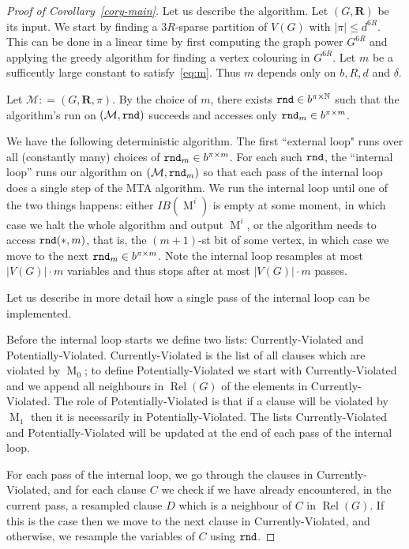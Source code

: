 \documentclass[12pt,a4paper]{article}
\numberwithin{equation}{section}
\theoremstyle{definition}
\newcommand{\de}{{\delta}}
\renewcommand{\le}{\leqslant}
\newcommand\NN{\mathbb N}
\renewcommand{\cal}[1]{{\mathcal #1}}
\newcommand\MT{\operatorname{M}}
\newcommand\Rel{\operatorname{Rel}}
\newcommand{\nn}{R}
\begin{document}
    
    \begin{proof}[Proof of Corollary~\ref{cory-main}]
       Let us describe the algorithm. Let $(G,\mathbf R)$ be its input. We start by finding a $3\nn$-sparse partition of $V(G)$ with $|\pi|\le d^{6\nn}$. This can be done in a linear time by first computing the graph power $G^{6\nn}$ and applying the greedy algorithm for finding a vertex colouring in $G^{6\nn}$. Let $m$ be a sufficently large constant to satisfy~\eqref{eq:m}. Thus $m$ depends only on $b,\nn, d$ and $\de$. 
    
    Let $\cal M: = (G, \mathbf R, \pi)$. By the choice of $m$,  there exists $\rnd\in  b^{\pi\times \NN}$ such that the algorithm's run on $(\cal M, \rnd)$ succeeds and accesses only $\normalfont{\texttt{rnd}}_m\in b^{\pi\times m}$. 
    
    We have the following deterministic algorithm. The first ``external loop" runs over all (constantly many) choices of $\normalfont{\texttt{rnd}}_m\in b^{\pi\times m}$. For each such $\normalfont{\texttt{rnd}}$, the ``internal loop'' runs our algorithm on $(\cal M,\rnd_m)$ so that each pass of the internal loop does a single step of the MTA algorithm. We run the internal loop
    until one of the two things happens: either  $IB(\MT^i)$ is empty at some moment, in which case we halt the whole algorithm and output $\MT^i$, or the algorithm needs to access $\normalfont{\texttt{rnd}}( \ast, m)$, that is, the $(m+1)$-st bit of some vertex, in which case we move to the next $\normalfont{\texttt{rnd}}_m\in b^{\pi\times m}$. Note the internal loop resamples at most $|V(G)|\cdot m$ variables and thus stops after at most $|V(G)|\cdot m$ passes.  
    
Let us describe in more detail how  a single pass of the internal loop can be implemented.    

Before the internal loop starts we define two lists: Currently-Violated and Potentially-Violated.  Currently-Violated is the list of all clauses which are violated by $\MT_0$; to define Potentially-Violated we start with Currently-Violated and we append all neighbours in $\Rel(G)$ of the elements in Currently-Violated. The role of Potentially-Violated is that if a clause will be violated by $\MT_1$ then it is necessarily in Potentially-Violated.  The lists Currently-Violated and Potentially-Violated will be updated at the end of each pass of the internal loop. 
    
For each pass of the internal loop, we go through the clauses in Currently-Violated, and for each clause $C$ we check if we have already encountered, in the current pass, a resampled clause $D$ which is a neighbour of $C$ in $\Rel(G)$. If this is the case then we move to the next clause in Currently-Violated, and otherwise, we resample the variables of $C$ using $\normalfont{\texttt{rnd}}$. 
    

\end{proof}
\end{document}
